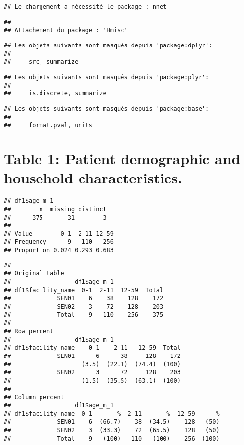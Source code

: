 \documentclass[
]{article}
\begin{document}
\begin{verbatim}
## Le chargement a nécessité le package : nnet
\end{verbatim}

\begin{verbatim}
## 
## Attachement du package : 'Hmisc'
\end{verbatim}

\begin{verbatim}
## Les objets suivants sont masqués depuis 'package:dplyr':
## 
##     src, summarize
\end{verbatim}

\begin{verbatim}
## Les objets suivants sont masqués depuis 'package:plyr':
## 
##     is.discrete, summarize
\end{verbatim}

\begin{verbatim}
## Les objets suivants sont masqués depuis 'package:base':
## 
##     format.pval, units
\end{verbatim}

\hypertarget{table-1-patient-demographic-and-household-characteristics.}{%
\section{Table 1: Patient demographic and household
characteristics.}\label{table-1-patient-demographic-and-household-characteristics.}}

\begin{verbatim}
## df1$age_m_1 
##        n  missing distinct 
##      375       31        3 
##                             
## Value        0-1  2-11 12-59
## Frequency      9   110   256
## Proportion 0.024 0.293 0.683
\end{verbatim}

\begin{verbatim}
## 
## Original table 
##                  df1$age_m_1
## df1$facility_name  0-1  2-11  12-59  Total
##             SEN01    6    38    128    172
##             SEN02    3    72    128    203
##             Total    9   110    256    375
## 
## Row percent 
##                  df1$age_m_1
## df1$facility_name    0-1    2-11   12-59  Total
##             SEN01      6      38     128    172
##                    (3.5)  (22.1)  (74.4)  (100)
##             SEN02      3      72     128    203
##                    (1.5)  (35.5)  (63.1)  (100)
## 
## Column percent 
##                  df1$age_m_1
## df1$facility_name  0-1       %  2-11       %  12-59      %
##             SEN01    6  (66.7)    38  (34.5)    128   (50)
##             SEN02    3  (33.3)    72  (65.5)    128   (50)
##             Total    9   (100)   110   (100)    256  (100)
\end{verbatim}
\end{document}
